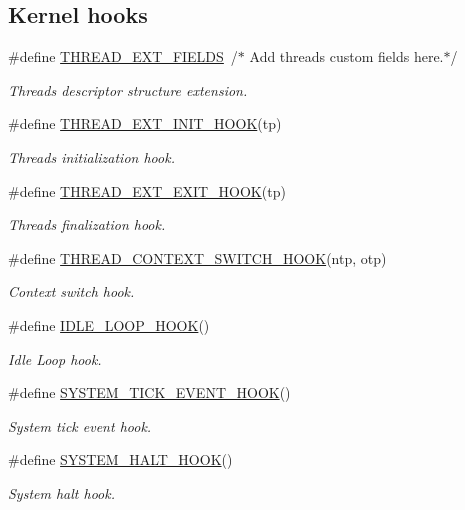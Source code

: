 \subsection*{Kernel hooks}
\begin{DoxyCompactItemize}
\item 
\#define \hyperlink{group__config_gaba26fd717f33330fa56dcc7919a3f02f}{T\+H\+R\+E\+A\+D\+\_\+\+E\+X\+T\+\_\+\+F\+I\+E\+L\+D\+S}~/$\ast$ Add threads custom fields here.$\ast$/
\begin{DoxyCompactList}\small\item\em Threads descriptor structure extension. \end{DoxyCompactList}\item 
\#define \hyperlink{group__config_gaeb57466a9200b8c073ac96a3f1a9c34c}{T\+H\+R\+E\+A\+D\+\_\+\+E\+X\+T\+\_\+\+I\+N\+I\+T\+\_\+\+H\+O\+O\+K}(tp)
\begin{DoxyCompactList}\small\item\em Threads initialization hook. \end{DoxyCompactList}\item 
\#define \hyperlink{group__config_gab8f241a87da52027625c9cc3d8403ebb}{T\+H\+R\+E\+A\+D\+\_\+\+E\+X\+T\+\_\+\+E\+X\+I\+T\+\_\+\+H\+O\+O\+K}(tp)
\begin{DoxyCompactList}\small\item\em Threads finalization hook. \end{DoxyCompactList}\item 
\#define \hyperlink{group__config_gac0317ee1a14709d39aef80ca8980a40a}{T\+H\+R\+E\+A\+D\+\_\+\+C\+O\+N\+T\+E\+X\+T\+\_\+\+S\+W\+I\+T\+C\+H\+\_\+\+H\+O\+O\+K}(ntp,  otp)
\begin{DoxyCompactList}\small\item\em Context switch hook. \end{DoxyCompactList}\item 
\#define \hyperlink{group__config_gae52e2c3230a9e87d16befd547c2f92ef}{I\+D\+L\+E\+\_\+\+L\+O\+O\+P\+\_\+\+H\+O\+O\+K}()
\begin{DoxyCompactList}\small\item\em Idle Loop hook. \end{DoxyCompactList}\item 
\#define \hyperlink{group__config_ga132e1bd495c4f7c9b92d63b26705dfe1}{S\+Y\+S\+T\+E\+M\+\_\+\+T\+I\+C\+K\+\_\+\+E\+V\+E\+N\+T\+\_\+\+H\+O\+O\+K}()
\begin{DoxyCompactList}\small\item\em System tick event hook. \end{DoxyCompactList}\item 
\#define \hyperlink{group__config_ga71e0932757a8180816104fa313171c9a}{S\+Y\+S\+T\+E\+M\+\_\+\+H\+A\+L\+T\+\_\+\+H\+O\+O\+K}()
\begin{DoxyCompactList}\small\item\em System halt hook. \end{DoxyCompactList}\end{DoxyCompactItemize}


